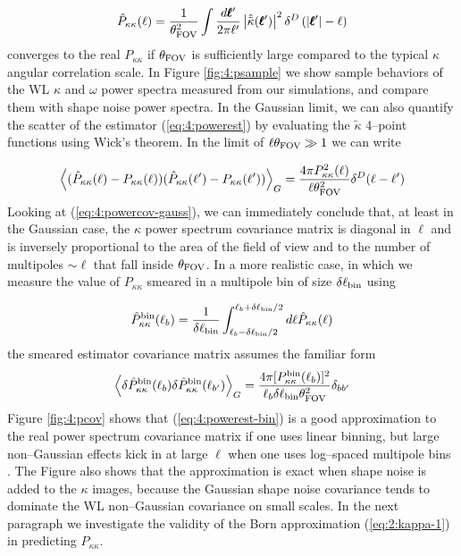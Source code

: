 \begin{equation}
\label{eq:4:powerest}
\hat{P}_{\kappa\kappa}(\ell) = \frac{1}{\theta_{\rm FOV}^2}\int\frac{d\pmb{\ell}'}{2\pi\ell'}\left\vert\hat{\tilde{\kappa}}(\pmb{\ell}')\right\vert^2\delta^D\left(\vert\pmb{\ell}'\vert-\ell\right)
\end{equation}
%
converges to the real $P_{\kappa\kappa}$ if $\theta_{\rm FOV}$ is sufficiently large compared to the typical $\kappa$ angular correlation scale. In Figure \ref{fig:4:psample} we show sample behaviors of the WL $\kappa$ and $\omega$ power spectra measured from our simulations, and compare them with shape noise power spectra. In the Gaussian limit, we can also quantify the scatter of the estimator (\ref{eq:4:powerest}) by evaluating the $\tilde{\kappa}$ 4--point functions using Wick's theorem. In the limit of $\ell\theta_{\rm FOV}\gg 1$ we can write 

\begin{equation}
\label{eq:4:powercov-gauss}
\left\langle(\hat{P}_{\kappa\kappa}(\ell)-P_{\kappa\kappa}(\ell))(\hat{P}_{\kappa\kappa}(\ell')-P_{\kappa\kappa}(\ell'))\right\rangle_G = \frac{4\pi P^2_{\kappa\kappa}(\ell)}{\ell\theta^2_{\rm FOV}}\delta^D(\ell-\ell')
\end{equation}
%
Looking at (\ref{eq:4:powercov-gauss}), we can immediately conclude that, at least in the Gaussian case, the $\kappa$ power spectrum covariance matrix is diagonal in $\ell$ and is inversely proportional to the area of the field of view and to the number of multipoles $\sim\ell$ that fall inside $\theta_{\rm FOV}$. In a more realistic case, in which we measure the value of $P_{\kappa\kappa}$ smeared in a multipole bin of size $\delta\ell_{\rm bin}$ using   

\begin{equation}
\label{eq:4:powerest-bin}
\hat{P}^{\rm bin}_{\kappa\kappa}(\ell_b) = \frac{1}{\delta\ell_{\rm bin}}\int_{\ell_b-\delta\ell_{\rm bin}/2}^{\ell_b+\delta\ell_{\rm bin}/2} d\ell \hat{P}_{\kappa\kappa}(\ell)
\end{equation}
%
the smeared estimator covariance matrix assumes the familiar form 
%
\begin{equation}
\label{eq:4:powercov-gauss-bin}
\left\langle\delta\hat{P}^{\rm bin}_{\kappa\kappa}(\ell_b)\delta\hat{P}^{\rm bin}_{\kappa\kappa}(\ell_{b'})\right\rangle_G = \frac{4\pi [P^{\rm bin}_{\kappa\kappa}(\ell_b)]^2}{\ell_b\delta\ell_{\rm bin}\theta^2_{\rm FOV}}\delta_{bb'}
\end{equation}
%
Figure \ref{fig:4:pcov} shows that (\ref{eq:4:powerest-bin}) is a good approximation to the real power spectrum covariance matrix if one uses linear binning, but large non--Gaussian effects kick in at large $\ell$ when one uses log--spaced multipole bins \citep{Sato12,PetriVariance}. The Figure also shows that the approximation is exact when shape noise is added to the $\kappa$ images, because the Gaussian shape noise covariance tends to dominate the WL non--Gaussian covariance on small scales. In the next paragraph we investigate the validity of the Born approximation (\ref{eq:2:kappa-1}) in predicting $P_{\kappa\kappa}$. 

